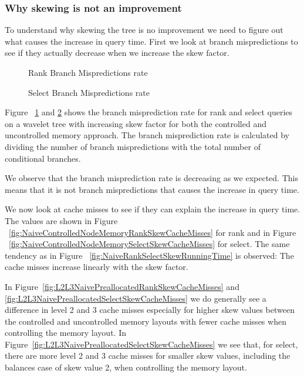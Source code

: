 \subsubsection{Why skewing is not an improvement}
To understand why skewing the tree is no improvement we need to figure out what causes the increase in query time. 
First we look at branch mispredictions to see if they actually decrease when we increase the skew factor.%
\begin{figure}
\caption{Rank Branch Mispredictions rate}
\label{fig:NaiveVsControlledNodeMemorySkewRankQueryBMrate}

\end{figure}%
\begin{figure}
\caption{Select Branch Mispredictions rate}
\label{fig:NaiveVsControlledNodeMemorySkewSelectQueryBMrate}

\end{figure}
 
Figure ~\ref{fig:NaiveVsControlledNodeMemorySkewRankQueryBMrate} and \ref{fig:NaiveVsControlledNodeMemorySkewSelectQueryBMrate} shows the branch misprediction rate for rank and select queries on a wavelet tree with increasing skew factor for both the controlled and uncontrolled memory approach. 
The branch misprediction rate is calculated by dividing the number of branch mispredictions with the total number of conditional branches.

We observe that the branch misprediction rate is decreasing as we expected. 
This means that it is not branch mispredictions that causes the increase in query time. 

We now look at cache misses to see if they can explain the increase in query time. 
The values are shown in Figure ~\ref{fig:NaiveControlledNodeMemoryRankSkewCacheMisses} for rank and in Figure ~\ref{fig:NaiveControlledNodeMemorySelectSkewCacheMisses} for select.
The same tendency as in Figure ~\ref{fig:NaiveRankSelectSkewRunningTime} is observed: 
The cache misses increase linearly with the skew factor.

In Figure~\ref{fig:L2L3NaivePreallocatedRankSkewCacheMisses} and \ref{fig:L2L3NaivePreallocatedSelectSkewCacheMisses} we do generally see a difference in level 2 and 3 cache misses especially for higher skew values between the controlled and uncontrolled memory layouts with fewer cache misses when controlling the memory layout. In Figure~\ref{fig:L2L3NaivePreallocatedSelectSkewCacheMisses} we see that, for select, there are more level 2 and 3 cache misses for smaller skew values, including the balances case of skew value 2, when controlling the memory layout.

